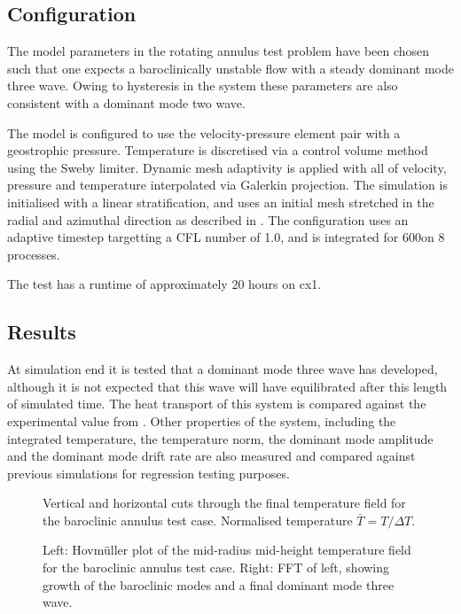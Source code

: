 \subsection{Configuration}

The model parameters in the rotating annulus test problem have been chosen such
that one expects a baroclinically unstable flow with a steady dominant mode three
wave. Owing to hysteresis in the system these parameters are also consistent with
a dominant mode two wave.

The model is configured to use the \Poo velocity-pressure element pair with a \Ptwo
geostrophic pressure. Temperature is discretised via a control volume method using
the Sweby limiter. Dynamic mesh adaptivity is applied with all of velocity, pressure
and temperature interpolated via Galerkin projection. The simulation is initialised
with a linear stratification, and uses an initial mesh stretched in
the radial and azimuthal direction as described in \citet{farnell1975}. The
configuration uses an adaptive timestep targetting a CFL number of 1.0, and is
integrated for 600\s[] on 8 processes.

The test has a runtime of approximately 20 hours on cx1.

\subsection{Results}

At simulation end it is tested that a dominant mode three wave has developed,
although it is not expected that this wave will have equilibrated after this
length of simulated time. The heat transport of this system is compared against
the experimental value from \citet{read2003}. Other properties of the system,
including the integrated temperature, the temperature \Ltwo norm, the dominant
mode amplitude and the dominant mode drift rate are also measured and compared
against previous simulations for regression testing purposes.

\begin{figure}[ht]
  \centering
  \caption{Vertical and horizontal cuts through the final temperature field
           for the baroclinic annulus test case. Normalised temperature
           $\bar{T} = T / \Delta T$.}
\end{figure}

\begin{figure}[ht]
  \centering
  \caption{Left: Hovm\"uller plot of the mid-radius mid-height temperature field
           for the baroclinic annulus test case. Right: FFT of left, showing
           growth of the baroclinic modes and a final dominant mode three wave.}
\end{figure}

